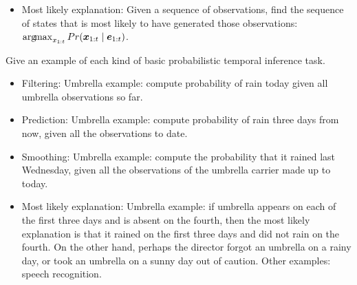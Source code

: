 \begin{questions}
\begin{solution}[4in]
\begin{itemize}
\item Most likely explanation: Given a sequence of observations, find the sequence of states that is most likely to have generated those observations: $\operatorname*{arg\!max}_{x_{1:t}} Pr(\bm{x}_{1:t} \mid \bm{e}_{1:t})$.
\end{itemize}
\end{solution}

\question Give an example of each kind of basic probabilistic temporal inference task.

\begin{solution}[4in]
\begin{itemize}
\item Filtering: Umbrella example: compute probability of rain today given all umbrella observations so far.
\item Prediction: Umbrella example: compute probability of rain three days from now, given all the observations
to date.
\item Smoothing: Umbrella example: compute the probability that it rained last Wednesday, given all the observations of the umbrella carrier made up to today.

\item Most likely explanation:  Umbrella example: if umbrella appears on each of the first three days and is absent on the fourth, then the most likely explanation is that it rained on the first three days and did not rain on the fourth.  On the other hand, perhaps the director forgot an umbrella on a rainy day, or took an umbrella on a sunny day out of caution.  Other examples: speech recognition.

\end{itemize}
\end{solution}


\end{questions}



